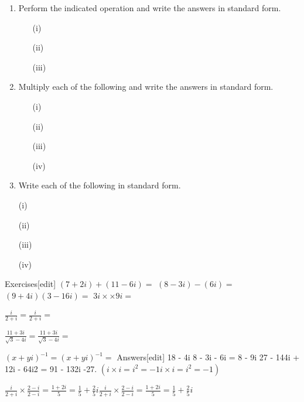 \documentclass[12pt, a4paper]{report}
\theoremstyle{plain}
\theoremstyle{definition}
\theoremstyle{remark}
\begin{document}

\begin{enumerate}

\item  Perform the indicated operation and write the answers in standard form.
\begin{itemize}
\item[(i)] 
\item[(ii)] 
\item[(iii)] 
\end{itemize}


\item   Multiply each of the following and write the answers in standard form.
\begin{itemize}
\item[(i)]    
\item[(ii)]    
\item[(iii)]    
\item[(iv)] 
\end{itemize}
   
\item  Write each of the following in standard form.
\item[(i)]    
\item[(ii)]    
\item[(iii)]    
\item[(iv)]    


\end{enumerate}


Exercises[edit]
$(7 + 2i) + (11 - 6i) =$
$(8 - 3i) - (6i) =$
$(9 + 4i)(3 - 16i) =$
$3i {\displaystyle \times } \times  9i =$

${\displaystyle {\frac {i}{2+i}}=} {\displaystyle {\frac {i}{2+i}}=}$

${\displaystyle {\frac {11+3i}{{\sqrt {3}}-4i}}=} {\displaystyle {\frac {11+3i}{{\sqrt {3}}-4i}}=}$

${\displaystyle {(x+yi)}^{-1}=} {\displaystyle {(x+yi)}^{-1}=}$
Answers[edit]
18 - 4i
8 - 3i - 6i = 8 - 9i
27 - 144i + 12i - 64i2 = 91 - 132i
-27. $( {\displaystyle i\times i=i^{2}=-1} {\displaystyle i\times i=i^{2}=-1})$

${\displaystyle {\frac {i}{2+i}}\times {\frac {2-i}{2-i}}={\frac {1+2i}{5}}={\frac {1}{5}}+{\frac {2}{5}}i} {\displaystyle {\frac {i}{2+i}}\times {\frac {2-i}{2-i}}={\frac {1+2i}{5}}={\frac {1}{5}}+{\frac {2}{5}}i}$
\end{document}
